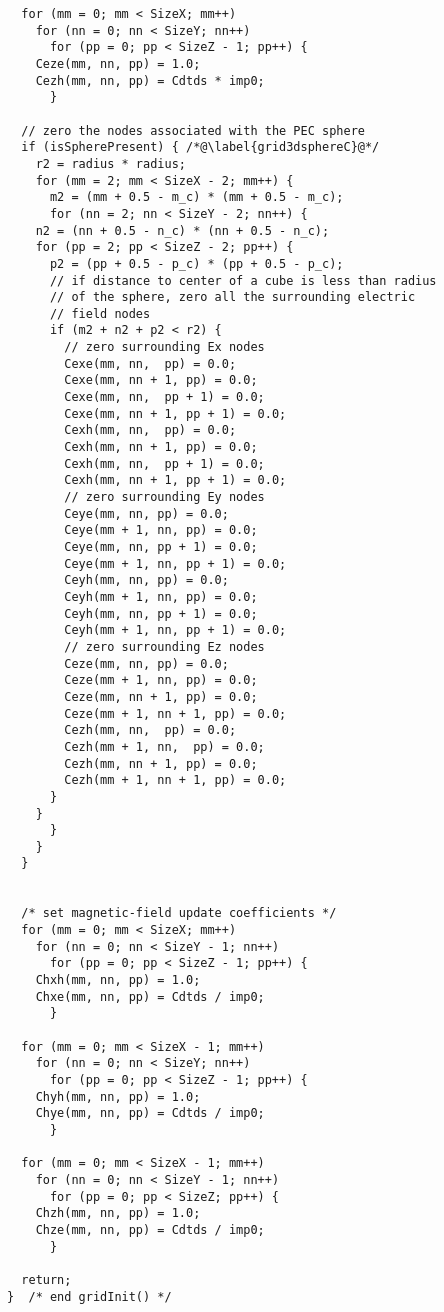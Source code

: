 \begin{program}
\begin{lstlisting}
  for (mm = 0; mm < SizeX; mm++)
    for (nn = 0; nn < SizeY; nn++) 
      for (pp = 0; pp < SizeZ - 1; pp++) {
	Ceze(mm, nn, pp) = 1.0;
	Cezh(mm, nn, pp) = Cdtds * imp0;
      }

  // zero the nodes associated with the PEC sphere
  if (isSpherePresent) { /*@\label{grid3dsphereC}@*/
    r2 = radius * radius;
    for (mm = 2; mm < SizeX - 2; mm++) {
      m2 = (mm + 0.5 - m_c) * (mm + 0.5 - m_c);
      for (nn = 2; nn < SizeY - 2; nn++) {
	n2 = (nn + 0.5 - n_c) * (nn + 0.5 - n_c);
	for (pp = 2; pp < SizeZ - 2; pp++) {
	  p2 = (pp + 0.5 - p_c) * (pp + 0.5 - p_c);
	  // if distance to center of a cube is less than radius 
	  // of the sphere, zero all the surrounding electric
	  // field nodes
	  if (m2 + n2 + p2 < r2) {
	    // zero surrounding Ex nodes
	    Cexe(mm, nn,  pp) = 0.0;
	    Cexe(mm, nn + 1, pp) = 0.0;
	    Cexe(mm, nn,  pp + 1) = 0.0;
	    Cexe(mm, nn + 1, pp + 1) = 0.0;
	    Cexh(mm, nn,  pp) = 0.0;
	    Cexh(mm, nn + 1, pp) = 0.0;
	    Cexh(mm, nn,  pp + 1) = 0.0;
	    Cexh(mm, nn + 1, pp + 1) = 0.0;
	    // zero surrounding Ey nodes
	    Ceye(mm, nn, pp) = 0.0;
	    Ceye(mm + 1, nn, pp) = 0.0;
	    Ceye(mm, nn, pp + 1) = 0.0;
	    Ceye(mm + 1, nn, pp + 1) = 0.0;
	    Ceyh(mm, nn, pp) = 0.0;
	    Ceyh(mm + 1, nn, pp) = 0.0;
	    Ceyh(mm, nn, pp + 1) = 0.0;
	    Ceyh(mm + 1, nn, pp + 1) = 0.0;
	    // zero surrounding Ez nodes
	    Ceze(mm, nn, pp) = 0.0;
	    Ceze(mm + 1, nn, pp) = 0.0;
	    Ceze(mm, nn + 1, pp) = 0.0;
	    Ceze(mm + 1, nn + 1, pp) = 0.0;
	    Cezh(mm, nn,  pp) = 0.0;
	    Cezh(mm + 1, nn,  pp) = 0.0;
	    Cezh(mm, nn + 1, pp) = 0.0;
	    Cezh(mm + 1, nn + 1, pp) = 0.0;
	  }
	}
      }
    }
  }


  /* set magnetic-field update coefficients */
  for (mm = 0; mm < SizeX; mm++)
    for (nn = 0; nn < SizeY - 1; nn++) 
      for (pp = 0; pp < SizeZ - 1; pp++) {
	Chxh(mm, nn, pp) = 1.0;
	Chxe(mm, nn, pp) = Cdtds / imp0;
      }

  for (mm = 0; mm < SizeX - 1; mm++)
    for (nn = 0; nn < SizeY; nn++) 
      for (pp = 0; pp < SizeZ - 1; pp++) {
	Chyh(mm, nn, pp) = 1.0;
	Chye(mm, nn, pp) = Cdtds / imp0;
      }

  for (mm = 0; mm < SizeX - 1; mm++)
    for (nn = 0; nn < SizeY - 1; nn++) 
      for (pp = 0; pp < SizeZ; pp++) {
	Chzh(mm, nn, pp) = 1.0;
	Chze(mm, nn, pp) = Cdtds / imp0;
      }

  return;
}  /* end gridInit() */
\end{lstlisting}
\end{program}

